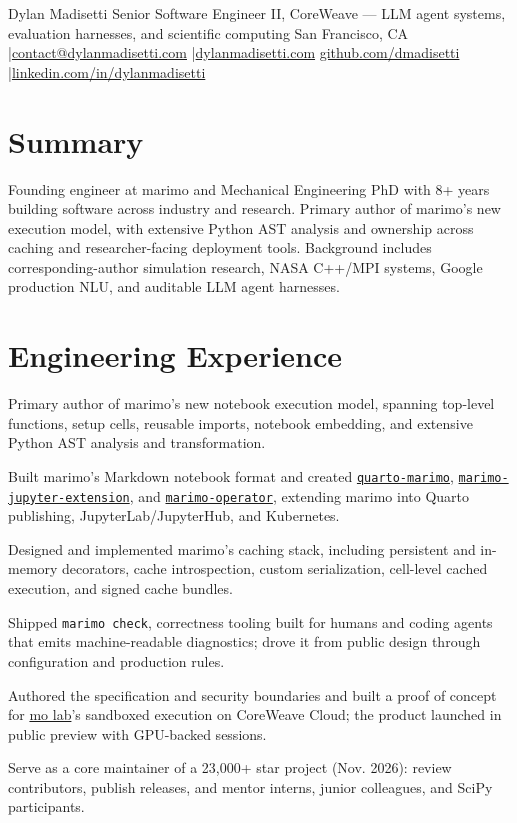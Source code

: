 \documentclass{semantic-resume}
\begin{document}
\resumeheader
  {Dylan Madisetti}
  {Senior Software Engineer II, CoreWeave --- LLM agent systems, evaluation harnesses, and scientific computing}
  {San Francisco, CA \enspace|\enspace \href{mailto:contact@dylanmadisetti.com}{contact@dylanmadisetti.com} \enspace|\enspace \href{https://www.dylanmadisetti.com}{dylanmadisetti.com}}
  {\href{https://github.com/dmadisetti}{github.com/dmadisetti} \enspace|\enspace \href{https://linkedin.com/in/dylanmadisetti}{linkedin.com/in/dylanmadisetti}}

\section{Summary}
Founding engineer at marimo and Mechanical Engineering PhD with 8+ years building
software across industry and research. Primary author of marimo's new execution
model, with extensive Python AST analysis and ownership across caching and
researcher-facing deployment tools. Background includes corresponding-author
simulation research, NASA C++/MPI systems, Google production NLU, and auditable
LLM agent harnesses.

\section{Engineering Experience}
\begin{resumeitems}
  \item Primary author of marimo's new notebook execution model, spanning top-level
    functions, setup cells, reusable imports, notebook embedding, and extensive
    Python AST analysis and transformation.
  \item Built marimo's Markdown notebook format and created
    \href{https://github.com/marimo-team/quarto-marimo}{\texttt{quarto-marimo}},
    \href{https://github.com/marimo-team/marimo-jupyter-extension}{\texttt{marimo-jupyter-extension}},
    and \href{https://github.com/marimo-team/marimo-operator}{\texttt{marimo-operator}},
    extending marimo into Quarto publishing, JupyterLab/JupyterHub, and Kubernetes.
  \item Designed and implemented marimo's caching stack, including persistent and
    in-memory decorators, cache introspection, custom serialization, cell-level
    cached execution, and signed cache bundles.
  \item Shipped \texttt{marimo check}, correctness tooling built for humans and coding
    agents that emits machine-readable diagnostics; drove it from public design
    through configuration and production rules.
  \item Authored the specification and security boundaries and built a proof of
    concept for \href{https://molab.marimo.io}{mo lab}'s sandboxed execution on
    CoreWeave Cloud; the product launched in public preview with GPU-backed sessions.
  \item Serve as a core maintainer of a 23{,}000+ star project (Nov. 2026): review
    contributors, publish releases, and mentor interns, junior colleagues, and
    SciPy participants.
\end{resumeitems}
\end{document}
